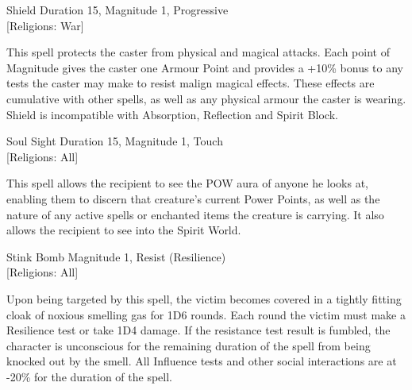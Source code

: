 \begin{rpg-spell}
{Shield}
{Duration 15, Magnitude 1, Progressive\\{[Religions: War]}}

This spell protects the caster from physical and magical attacks. Each point of Magnitude gives the caster one Armour Point and provides a +10\% bonus to any tests the caster may make to resist malign magical effects. These effects are cumulative with other spells, as well as any physical armour the caster is wearing. Shield is incompatible with Absorption, Reflection and Spirit Block. 
\end{rpg-spell}

\begin{rpg-spell}
{Soul Sight}
{Duration 15, Magnitude 1, Touch\\{[Religions: All]}}

This spell allows the recipient to see the POW aura of anyone he looks at, enabling them to discern that creature’s current Power Points, as well as the nature of any active spells or enchanted items the creature is carrying. It also allows the recipient to see into the Spirit World. 
\end{rpg-spell}


\begin{rpg-spell}
{Stink Bomb}
{Magnitude 1, Resist (Resilience)\\{[Religions: All]}}

Upon being targeted by this spell, the victim becomes covered in a tightly fitting cloak of noxious smelling gas for 1D6 rounds. Each round the victim must make a Resilience test or take 1D4 damage. If the resistance test result is fumbled, the character is unconscious for the remaining duration of the spell from being knocked out by the smell. All Influence tests and other social interactions are at -20\% for the duration of the spell.
\end{rpg-spell}


